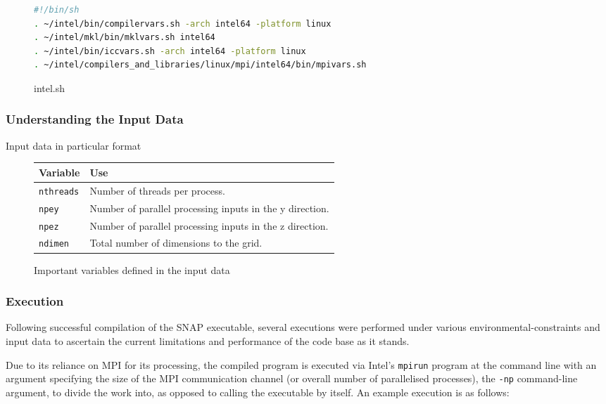 \documentclass[conference]{IEEEtran}
\begin{document}
\begin{figure}[h]
    \centering
    \begin{lstlisting}[language=bash, breaklines]
#!/bin/sh
. ~/intel/bin/compilervars.sh -arch intel64 -platform linux
. ~/intel/mkl/bin/mklvars.sh intel64
. ~/intel/bin/iccvars.sh -arch intel64 -platform linux
. ~/intel/compilers_and_libraries/linux/mpi/intel64/bin/mpivars.sh 
    \end{lstlisting}
    \caption{intel.sh}
    \label{fig:source_list}
\end{figure}


\subsubsection{Understanding the Input Data}


Input data in particular format

\begin{figure}[h]
    \centering
    \begin{tabular}{| p{1.7cm} | p{5.7cm} |}
        \hline
        Variable & Use \\
        \hline
        \texttt{nthreads} & Number of threads per process. \\
        \texttt{npey} & Number of parallel processing inputs in the y direction. \\
        \texttt{npez} & Number of parallel processing inputs in the z direction. \\
        \texttt{ndimen} & Total number of dimensions to the grid. \\
        \hline
    \end{tabular}
    \caption{Important variables defined in the input data}
    \label{table:input-data}
\end{figure}



\subsubsection{Execution}

Following successful compilation of the SNAP executable, several executions were performed under various environmental-constraints and input data to ascertain the current limitations and performance of the code base as it stands.

Due to its reliance on MPI for its processing, the compiled program is executed via Intel's \texttt{mpirun} program at the command line with an argument specifying the size of the MPI communication channel (or overall number of parallelised processes), the \texttt{-np} command-line argument, to divide the work into, as opposed to calling the executable by itself. An example execution is as follows:
\end{document}
